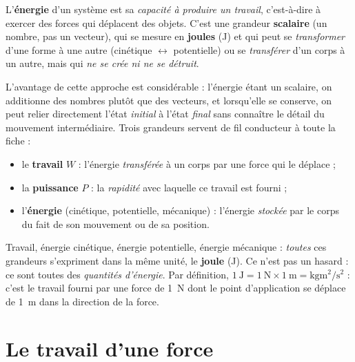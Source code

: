 \documentclass[11pt,a4paper]{article}
\begin{document}
\begin{definition}[énergie]
L'\textbf{énergie} d'un système est sa \emph{capacité à produire un travail}, c'est-à-dire à
exercer des forces qui déplacent des objets. C'est une grandeur \textbf{scalaire} (un nombre, pas
un vecteur), qui se mesure en \textbf{joules} (\si{\joule}) et qui peut se \emph{transformer}
d'une forme à une autre (cinétique $\leftrightarrow$ potentielle) ou se \emph{transférer}
d'un corps à un autre, mais qui \emph{ne se crée ni ne se détruit}.
\end{definition}

L'avantage de cette approche est considérable : l'énergie étant un scalaire, on additionne des
nombres plutôt que des vecteurs, et lorsqu'elle se conserve, on peut relier directement l'état
\emph{initial} à l'état \emph{final} sans connaître le détail du mouvement intermédiaire. Trois
grandeurs servent de fil conducteur à toute la fiche :

\begin{itemize}[leftmargin=1.6em,topsep=2pt,itemsep=2pt]
  \item le \textbf{travail} $W$ : l'énergie \emph{transférée} à un corps par une force qui le déplace ;
  \item la \textbf{puissance} $P$ : la \emph{rapidité} avec laquelle ce travail est fourni ;
  \item l'\textbf{énergie} (cinétique, potentielle, mécanique) : l'énergie \emph{stockée} par le corps du fait de son mouvement ou de sa position.
\end{itemize}

\begin{remarque}
Travail, énergie cinétique, énergie potentielle, énergie mécanique : \emph{toutes} ces grandeurs
s'expriment dans la même unité, le \textbf{joule} (\si{\joule}). Ce n'est pas un hasard : ce sont
toutes des \emph{quantités d'énergie}. Par définition, \(\SI{1}{\joule}=\SI{1}{\newton}\times\SI{1}{\metre}
=\si{\kilogram\metre\squared\per\second\squared}\) : c'est le travail fourni par une force de
\SI{1}{\newton} dont le point d'application se déplace de \SI{1}{\metre} dans la direction de la force.
\end{remarque}

\section{Le travail d'une force}
\end{document}
